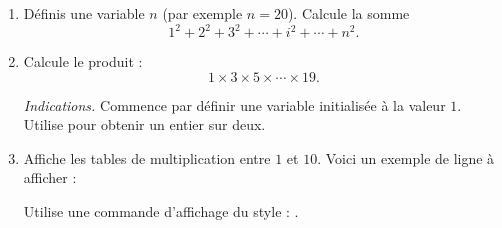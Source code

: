 \documentclass[11pt,class=report,crop=false]{standalone}
\begin{document}

\begin{activite}


\begin{enumerate}
  \item Définis une variable $n$ (par exemple $n=20$). Calcule la somme
  $$1^2+2^2+3^2+\cdots+i^2+\cdots +n^2.$$
  
  \item Calcule le produit :
  $$1 \times 3 \times 5 \times \cdots \times 19.$$
  
  \emph{Indications.} Commence par définir une variable  initialisée à la valeur $1$. Utilise  pour obtenir un entier sur deux.
  
  \item Affiche les tables de multiplication entre $1$ et $10$. Voici un exemple de ligne à afficher :
  
  Utilise une commande d'affichage du style : .
\end{enumerate}  
\end{activite}
\end{document}

